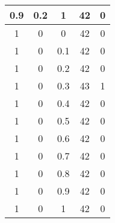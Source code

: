 \begin{table}[!h]
\begin{center}
\begin{tabular}{|c|c|c|c|c|}
			0.9  & 0.2  & 1    & 42  & 0     \\ \hline
			1    & 0    & 0    & 42  & 0  \\
			1    & 0    & 0.1  & 42  & 0  \\
			1    & 0    & 0.2  & 42  & 0     \\
			1    & 0    & 0.3  & 43  & 1   \\
			1    & 0    & 0.4  & 42  & 0   \\
			1    & 0    & 0.5  & 42  & 0     \\
			1    & 0    & 0.6  & 42  & 0   \\
			1    & 0    & 0.7  & 42  & 0   \\
			1    & 0    & 0.8  & 42  & 0   \\
			1    & 0    & 0.9  & 42  & 0   \\
			1    & 0    & 1    & 42  & 0  \\
			\hline
		\end{tabular}
	\end{center}
\end{table}